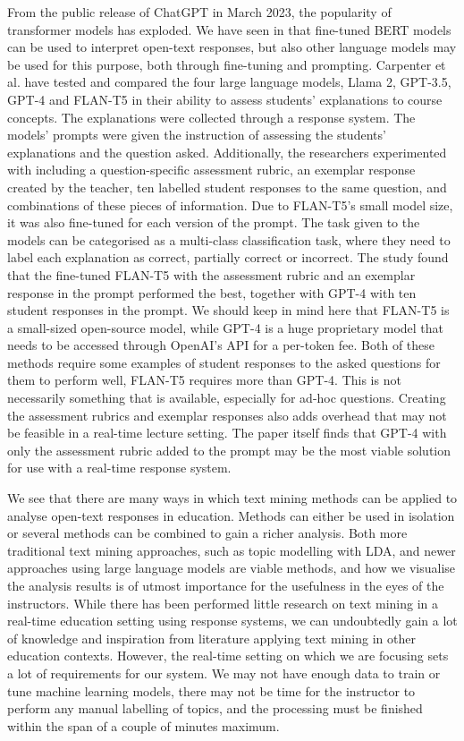 From the public release of ChatGPT in March 2023, the popularity of transformer models has exploded. We have seen in \cite{setsum2022} that fine-tuned BERT models can be used to interpret open-text responses, but also other language models may be used for this purpose, both through fine-tuning and prompting. Carpenter et al. \cite{carpenter2024} have tested and compared the four large language models, Llama 2, GPT-3.5, GPT-4 and FLAN-T5 in their ability to assess students' explanations to course concepts. The explanations were collected through a response system. The models' prompts were given the instruction of assessing the students' explanations and the question asked. Additionally, the researchers experimented with including a question-specific assessment rubric, an exemplar response created by the teacher, ten labelled student responses to the same question, and combinations of these pieces of information. Due to FLAN-T5's small model size, it was also fine-tuned for each version of the prompt. The task given to the models can be categorised as a multi-class classification task, where they need to label each explanation as correct, partially correct or incorrect. The study found that the fine-tuned FLAN-T5 with the assessment rubric and an exemplar response in the prompt performed the best, together with GPT-4 with ten student responses in the prompt. We should keep in mind here that FLAN-T5 is a small-sized open-source model, while GPT-4 is a huge proprietary model that needs to be accessed through OpenAI's API for a per-token fee. Both of these methods require some examples of student responses to the asked questions for them to perform well, FLAN-T5 requires more than GPT-4. This is not necessarily something that is available, especially for ad-hoc questions. Creating the assessment rubrics and exemplar responses also adds overhead that may not be feasible in a real-time lecture setting. The paper itself finds that GPT-4 with only the assessment rubric added to the prompt may be the most viable solution for use with a real-time response system.

We see that there are many ways in which text mining methods can be applied to analyse open-text responses in education. Methods can either be used in isolation or several methods can be combined to gain a richer analysis. Both more traditional text mining approaches, such as topic modelling with LDA, and newer approaches using large language models are viable methods, and how we visualise the analysis results is of utmost importance for the usefulness in the eyes of the instructors. While there has been performed little research on text mining in a real-time education setting using response systems, we can undoubtedly gain a lot of knowledge and inspiration from literature applying text mining in other education contexts. However, the real-time setting on which we are focusing sets a lot of requirements for our system. We may not have enough data to train or tune machine learning models, there may not be time for the instructor to perform any manual labelling of topics, and the processing must be finished within the span of a couple of minutes maximum.




